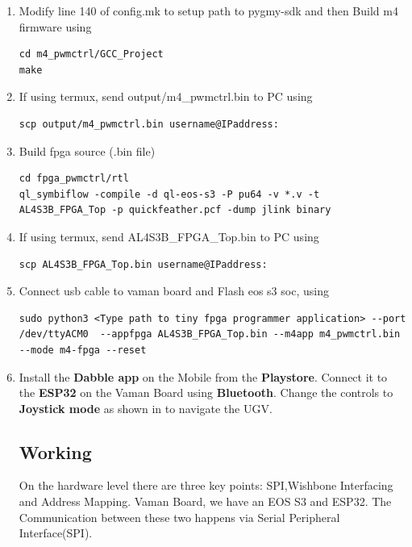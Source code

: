 \begin{enumerate}[label=\thesection.\arabic*.,ref=\thesection.\theenumi]
\item  Modify line 140 of config.mk to setup path to pygmy-sdk and then Build m4 firmware using
\begin{lstlisting}
cd m4_pwmctrl/GCC_Project
make
\end{lstlisting}

\item If using termux, send output/m4{\_}pwmctrl.bin to PC using
\begin{lstlisting}
scp output/m4_pwmctrl.bin username@IPaddress:
\end{lstlisting} 

\item Build fpga source (.bin file)
\begin{lstlisting}
cd fpga_pwmctrl/rtl
ql_symbiflow -compile -d ql-eos-s3 -P pu64 -v *.v -t AL4S3B_FPGA_Top -p quickfeather.pcf -dump jlink binary 
\end{lstlisting} 

\item If using termux, send AL4S3B{\_}FPGA{\_}Top.bin to PC using
\begin{lstlisting}
scp AL4S3B_FPGA_Top.bin username@IPaddress:
\end{lstlisting} 

\item Connect usb cable to vaman board and Flash eos s3 soc, using
\begin{lstlisting}
sudo python3 <Type path to tiny fpga programmer application> --port /dev/ttyACM0  --appfpga AL4S3B_FPGA_Top.bin --m4app m4_pwmctrl.bin --mode m4-fpga --reset
\end{lstlisting} 

\item Install the \textbf{Dabble app} on the Mobile from the \textbf{Playstore}. Connect it to the \textbf{ESP32} on the Vaman Board using \textbf{Bluetooth}. Change the controls to \textbf{Joystick mode} as shown in to navigate the UGV.\\
\subsection{Working }
On the hardware level there are three key points: SPI,Wishbone Interfacing and Address Mapping. Vaman Board, we have an EOS S3 and ESP32. The Communication between these two happens via Serial Peripheral Interface(SPI).\\
\vspace{0.25cm}


\end{enumerate}

